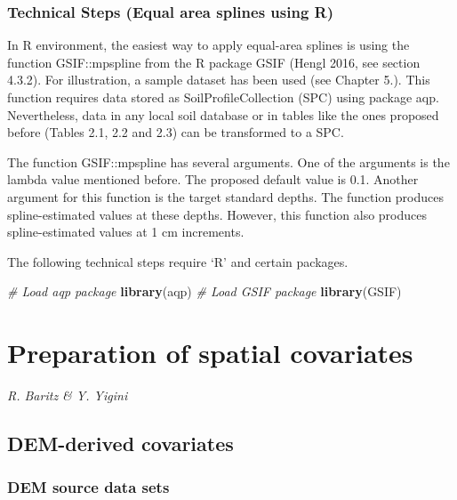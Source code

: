 \documentclass[]{book}
\newenvironment{Shaded}{\begin{snugshade}}{\end{snugshade}}
\newcommand{\KeywordTok}[1]{\textcolor[rgb]{0.13,0.29,0.53}{\textbf{{#1}}}}
\newcommand{\CommentTok}[1]{\textcolor[rgb]{0.56,0.35,0.01}{\textit{{#1}}}}
\newcommand{\NormalTok}[1]{{#1}}
\theoremstyle{definition}
\theoremstyle{definition}
\theoremstyle{definition}
\theoremstyle{remark}
\begin{document}
\subsection{Technical Steps (Equal area splines using
R)}\label{technical-steps-equal-area-splines-using-r}

In R environment, the easiest way to apply equal-area splines is using
the function GSIF::mpspline from the R package GSIF (Hengl 2016, see
section 4.3.2). For illustration, a sample dataset has been used (see
Chapter 5.). This function requires data stored as SoilProfileCollection
(SPC) using package aqp. Nevertheless, data in any local soil database
or in tables like the ones proposed before (Tables 2.1, 2.2 and 2.3) can
be transformed to a SPC.

The function GSIF::mpspline has several arguments. One of the arguments
is the lambda value mentioned before. The proposed default value is 0.1.
Another argument for this function is the target standard depths. The
function produces spline-estimated values at these depths. However, this
function also produces spline-estimated values at 1 cm increments.

The following technical steps require `R' and certain packages.

\begin{Shaded}
\begin{Highlighting}[]
\CommentTok{# Load aqp package}
\KeywordTok{library}\NormalTok{(aqp)}
\CommentTok{# Load GSIF package}
\KeywordTok{library}\NormalTok{(GSIF)}
\end{Highlighting}
\end{Shaded}

\chapter{Preparation of spatial
covariates}\label{preparation-of-spatial-covariates}

\emph{R. Baritz \& Y. Yigini}

\section{DEM-derived covariates}\label{dem-derived-covariates}

\subsection{DEM source data sets}\label{dem-source-data-sets}
\end{document}
